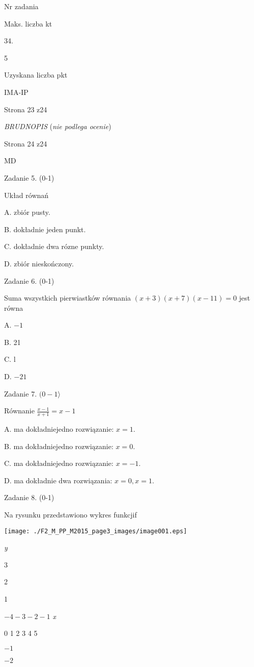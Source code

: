 \documentclass[a4paper,12pt]{article}
\begin{document}
Nr zadania

Maks. liczba kt

34.

5

Uzyskana liczba pkt

IMA-IP

Strona 23 z24





{\it BRUDNOPIS} ({\it nie podlega ocenie})

Strona 24 z24

MD





Zadanie 5. (0-1)

Układ równań 

A. zbiór pusty.

B. dokładnie jeden punkt.

C. dokładnie dwa rózne punkty.

D. zbiór nieskończony.

Zadanie 6. (0-1)

Suma wszystkich pierwiastków równania $(x+3)(x+7)(x-11)=0$ jest równa

A. $-1$

B. 21

C. l

D. $-21$

Zadanie 7. $(0-1\rangle$

Równanie $\displaystyle \frac{x-1}{x+1}=x-1$

A. ma dokładniejedno rozwiązanie: $x=1.$

B. ma dokładniejedno rozwiązanie: $x=0.$

C. ma dokładniejedno rozwiązanie: $x=-1.$

D. ma dokładnie dwa rozwiązania: $x=0, x=1.$

Zadanie 8. (0-1)

Na rysunku przedstawiono wykres funkcjif
\begin{center}
\texttt{[image: ./F2\_M\_PP\_M2015\_page3\_images/image001.eps]}
\end{center}
{\it y}

3

2

1

$-4 -3  -2 -1$  {\it x}

0  1 2 3 4  5

$-1$

$-2$
\end{document}
